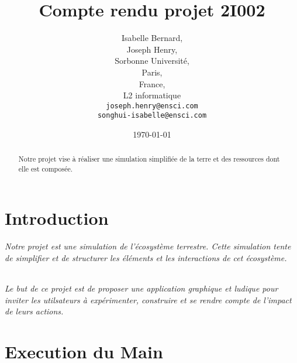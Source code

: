 \documentclass[11pt,a4paper]{article}
\begin{document}
\title{Compte rendu projet 2I002}
\author{Isabelle Bernard,\\
	Joseph Henry,\\
   Sorbonne Université,\\
   Paris,\\
   France,\\
   L2 informatique\\
   \texttt{joseph.henry@ensci.com}\\
   \texttt{songhui-isabelle@ensci.com}}
\date{\today}
\maketitle

\vspace{5\baselineskip}
\begin{abstract}
Notre projet vise à réaliser une simulation simplifiée de la terre et des ressources dont elle est composée.
\end{abstract}

\newpage

\part{Introduction}
\paragraph{Notre projet est une simulation de l'écosystème terrestre. Cette simulation tente de simplifier et de structurer les éléments et les interactions de cet écosystème.}
\paragraph{Le but de ce projet est de proposer une application graphique et ludique pour inviter les utilsateurs à expérimenter, construire et se rendre compte de l'impact de leurs actions.}

\part{Execution du Main}
\end{document}
